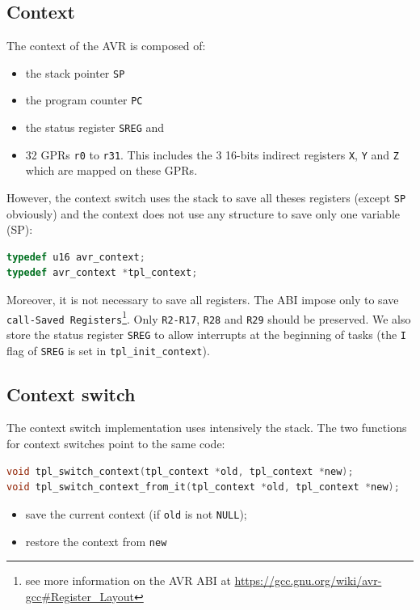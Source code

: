 \subsection{Context}
The context of the AVR is composed of:
\begin{itemize}
\item the stack pointer \texttt{SP}
\item the program counter \texttt{PC}
\item the status register \texttt{SREG} and 
\item 32 GPRs \texttt{r0} to \texttt{r31}. This includes the 3 16-bits indirect registers \texttt{X}, \texttt{Y} and \texttt{Z} which are mapped on these GPRs.
\end{itemize}

However, the context switch uses the stack to save all theses registers (except \texttt{SP} obviously) and the context does not use any structure to save only one variable (SP):
\begin{lstlisting}[language=C]
typedef u16 avr_context;
typedef avr_context *tpl_context;
\end{lstlisting}

Moreover, it is not necessary to save all registers. The ABI impose only to save \texttt{call-Saved Registers}\footnote{see more information on the AVR ABI at \url{https://gcc.gnu.org/wiki/avr-gcc\#Register\_Layout}}. Only \texttt{R2-R17}, \texttt{R28} and \texttt{R29} should be preserved. We also store the status register \texttt{SREG} to allow interrupts at the beginning of tasks (the \texttt{I} flag of \texttt{SREG} is set in \texttt{tpl_init_context}).

\subsection{Context switch}
The context switch implementation uses intensively the stack. The two functions for context switches point to the same code:

\begin{lstlisting}[language=C]
void tpl_switch_context(tpl_context *old, tpl_context *new);
void tpl_switch_context_from_it(tpl_context *old, tpl_context *new);
\end{lstlisting}

\begin{itemize}
\item save the current context (if \texttt{old} is not \texttt{NULL});
\item restore the context from \texttt{new}
\end{itemize}

